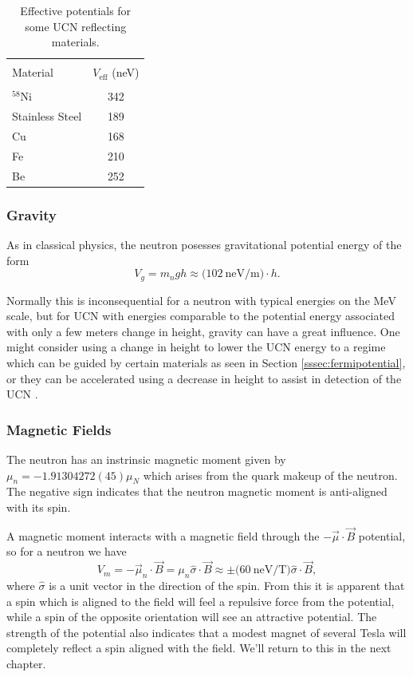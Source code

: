 \begin{table}[h]
  \caption{Effective potentials for some UCN reflecting materials.} 
  \centering
  \begin{tabular}{l c }
    \hline \\ [-1.75ex]
    Material & $V_{\mathrm{eff}}$ (neV) \\
    \hline \hline \\ [-1.75ex]
    $^{58}\mathrm{Ni}$ & 342 \\
    Stainless Steel & 189 \\
    Cu & 168 \\
    Fe & 210 \\
    Be & 252 \\
    \hline
  \end{tabular}
  \label{tab:fermipotential}
\end{table}


\subsubsection{Gravity}

As in classical physics, the neutron posesses gravitational potential energy of the form
%
\begin{equation}
  V_g = m_ngh \approx \big(102 \mathrm{~neV/m}\big) \cdot h.
\end{equation}

Normally this is inconsequential for a neutron with typical energies on the MeV scale,
but for UCN with energies comparable to the potential energy associated with only a few
meters change in height, gravity can have a great influence. One might consider using
a change in height to lower the UCN energy to a regime which can be guided by certain
materials as seen in Section \ref{sssec:fermipotential}, or they can be accelerated using
a decrease in height to assist in detection of the UCN \cite{golub1991ultra}.

\subsubsection{Magnetic Fields}

The neutron has an instrinsic magnetic moment given by
${\mu}_n = -1.91304272(45){\mu}_N$ \cite{pdg} which arises from the quark makeup of the neutron.
The negative sign indicates that the neutron magnetic moment is anti-aligned with its spin.

A magnetic moment interacts with a magnetic field through the $-\vec{\mu} \cdot \vec{B}$ potential, so for
a neutron we have
%
\begin{equation}
  V_m = -\vec{\mu}_n \cdot \vec{B} = \mu_n \hat{\sigma} \cdot \vec{B} \approx \pm \big(60 \mathrm{~neV/T}\big)
  \hat{\sigma} \cdot \vec{B}, 
\end{equation}
where $\hat{\sigma}$ is a unit vector in the direction of the spin. From this it is apparent that a spin which is
aligned to the field will feel a repulsive force from the potential, while a spin of the opposite orientation
will see an attractive potential. The strength of the potential also indicates that a modest magnet of several
Tesla will completely reflect a spin aligned with the field. We'll return to this in the next chapter.



